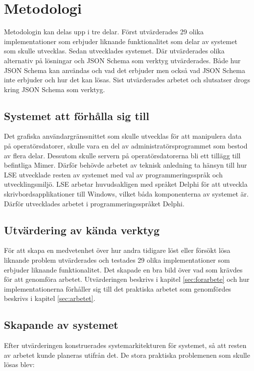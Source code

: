 \chapter{Metodologi}
\label{sec:metod}

Metodologin kan delas upp i tre delar. Först utvärderades 29 olika implementationer som erbjuder liknande funktionalitet som delar av systemet som skulle utvecklas. Sedan utvecklades systemet. Där utvärderades olika alternativ på lösningar och JSON Schema som verktyg utvärderades. Både hur JSON Schema kan användas och vad det erbjuder men också vad JSON Schema inte erbjuder och hur det kan lösas. Sist utvärderades arbetet och slutsatser drogs kring JSON Schema som verktyg.

\section{Systemet att förhålla sig till}
Det grafiska användargränssnittet som skulle utvecklas för att manipulera data på operatörsdatorer, skulle vara en del av administratörsprogrammet som bestod av flera delar. Dessutom skulle servern på operatörsdatorerna bli ett tillägg till befintliga Mimer. Därför behövde arbetet av teknisk anledning ta hänsyn till hur LSE utvecklade resten av systemet med val av programmeringsspråk och utvecklingsmiljö. LSE arbetar huvudsakligen med språket Delphi för att utveckla skrivbordsapplikationer till Windows, vilket båda komponenterna av systemet är. Därför utvecklades arbetet i programmeringsspråket Delphi.

\section{Utvärdering av kända verktyg}

För att skapa en medvetenhet över hur andra tidigare löst eller försökt lösa liknande problem utvärderades och testades 29 olika implementationer som erbjuder liknande funktionalitet. Det skapade en bra bild över vad som krävdes för att genomföra arbetet. Utvärderingen beskrivs i kapitel \ref{sec:forarbete} och hur implementationerna förhåller sig till det praktiska arbetet som genomfördes beskrivs i kapitel \ref{sec:arbetet}.

\section{Skapande av systemet}
\label{sec:metod:praktiska-frågor}
Efter utvärderingen konstruerades systemarkitekturen för systemet, så att resten av arbetet kunde planeras utifrån det. De stora praktiska problemenen som skulle lösas blev:

